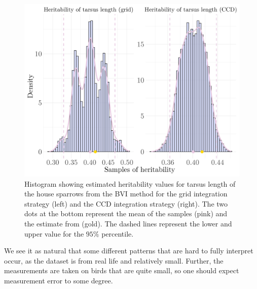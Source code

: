 \begin{figure}[H]
  \centering
  \includegraphics[width=\linewidth]{Figures/House sparrow study/Heritability_tarsus_combined.png}
  \caption[Estimated heritability of tarsus length]{Histogram showing estimated heritability values for tarsus length of the house sparrows from the BVI method for the grid integration strategy (left) and the CCD integration strategy (right). The two dots at the bottom represent the mean of the samples (pink) and the estimate from \citep{Silva2017} (gold). The dashed lines represent the lower and upper value for the $95\%$ percentile.}
  \label{fig:heritability_tarsus_combined}
\end{figure}
\noindent We see it as natural that some different patterns that are hard to fully interpret occur, as the dataset is from real life and relatively small. Further, the measurements are taken on birds that are quite small, so one should expect measurement error to some degree.

